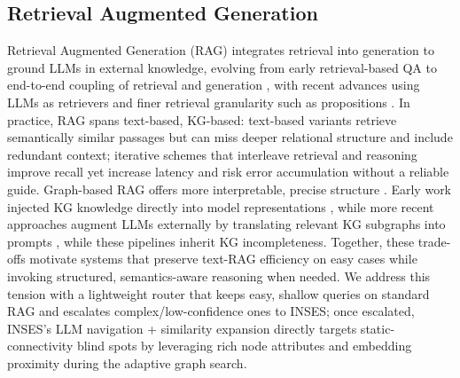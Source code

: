 \documentclass{article}
\theoremstyle{plain}
\theoremstyle{definition}
\theoremstyle{remark}
\begin{document}
\subsection{Retrieval Augmented Generation}
Retrieval Augmented Generation (RAG) integrates retrieval into generation to ground LLMs in external knowledge, evolving from early retrieval-based QA \citep{chen2017reading, karpukhin2020dense, guu2020realm} to end-to-end coupling of retrieval and generation \citep{lewis2020retrieval}, with recent advances using LLMs as retrievers \citep{yu2023augmentation, sun2023chatgpt} and finer retrieval granularity such as propositions \citep{chen2024dense}. In practice, RAG spans text-based, KG-based: text-based variants retrieve semantically similar passages \citep{gao2023retrieval, zhao2024retrieval, xiao2025lag, chen2025you} but can miss deeper relational structure and include redundant context; iterative schemes that interleave retrieval and reasoning \citep{shao2023enhancing, trivedi2023interleaving, wei2022chain, gao2023precise} improve recall yet increase latency and risk error accumulation without a reliable guide. Graph-based RAG offers more interpretable, precise structure \citep{wang2024knowledge, liang2025kag}. Early work injected KG knowledge directly into model representations \citep{peters2019knowledge, liu2020k}, while more recent approaches augment LLMs externally by translating relevant KG subgraphs into prompts \citep{wen2024mindmap, dai2025large, zhang2024knowgpt}, while these pipelines inherit KG incompleteness. Together, these trade-offs motivate systems that preserve text-RAG efficiency on easy cases while invoking structured, semantics-aware reasoning when needed. We address this tension with a lightweight router that keeps easy, shallow queries on standard RAG and escalates complex/low-confidence ones to INSES; once escalated, INSES’s LLM navigation + similarity expansion directly targets static-connectivity blind spots by leveraging rich node attributes and embedding proximity during the adaptive graph search.
\end{document}
